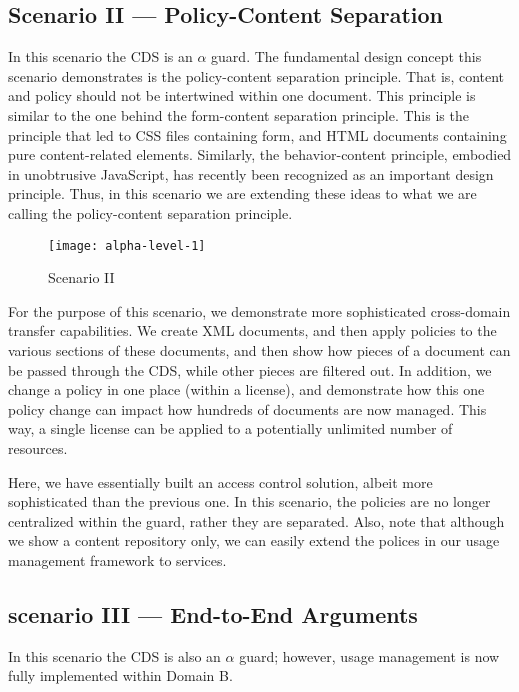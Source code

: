 \subsection{Scenario II --- Policy-Content Separation}
In this scenario the CDS is an $\alpha$ guard. The fundamental design concept this scenario demonstrates is the policy-content separation principle. That is, content and policy should not be intertwined within one document.  This principle is similar to the one behind the form-content separation principle. This is the principle that led to CSS files containing form, and HTML documents containing pure content-related elements. Similarly, the behavior-content principle, embodied in unobtrusive JavaScript, has recently been recognized as an important design principle. Thus, in this scenario we are extending these ideas to what we are calling the policy-content separation principle.

\begin{figure}[!t]
\centering
\texttt{[image: alpha-level-1]}
\caption{Scenario II}
\label{fig:model:alpha-level-1}
\end{figure}

For the purpose of this scenario, we demonstrate more sophisticated cross-domain transfer capabilities.  We create XML documents, and then apply policies to the various sections of these documents, and then show how pieces of a document can be passed through the CDS, while other pieces are filtered out. In addition, we change a policy in one place (within a license), and demonstrate how this one policy change can impact how hundreds of documents are now managed.  This way, a single license can be applied to a potentially unlimited number of resources.

Here, we have essentially built an access control solution, albeit more sophisticated than the previous one. In this scenario, the policies are no longer centralized within the guard, rather they are separated.  Also, note that although we show a content repository only, we can easily extend the polices in our usage management framework to services.

\subsection{scenario III --- End-to-End Arguments}
In this scenario the CDS is also an $\alpha$ guard; however, usage management is now fully implemented within Domain B.

